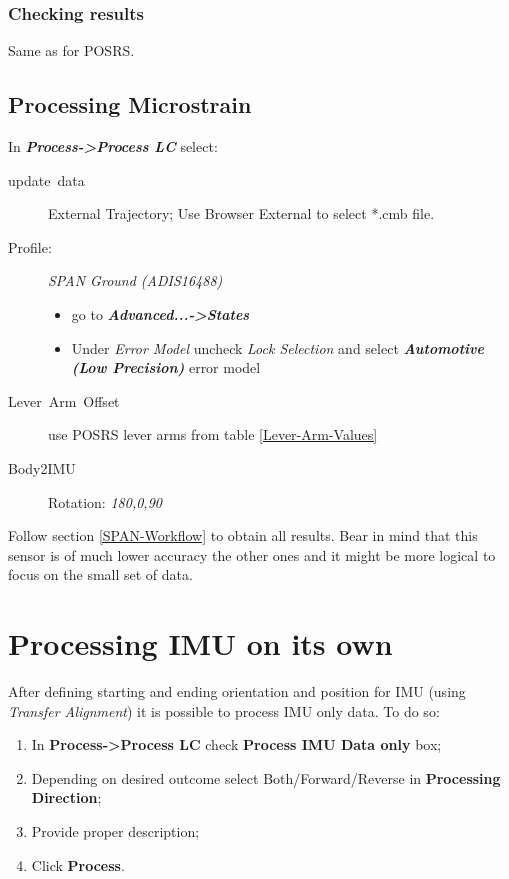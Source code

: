 \documentclass[british]{book}
\begin{document}
\subsubsection{Checking results}

Same as for POSRS.

\subsection{Processing Microstrain}\label{sub:Processing-Microstrain}

In \textbf{\emph{Process->Process LC}} select:
\begin{description}
	\item [{update~data}] External Trajectory; Use Browser External to select {*}.cmb file.
	\item [{Profile:}] \emph{SPAN Ground (ADIS16488) }
		\begin{itemize}
			\item go to \textbf{\emph{Advanced...->States}}
			\item Under \emph{Error Model} uncheck \emph{Lock Selection} and select \textbf{\emph{Automotive (Low Precision)}} error model
		\end{itemize}
	\item [{Lever~Arm~Offset}] use POSRS lever arms from table \ref{Lever-Arm-Values}
	\item [{Body2IMU}] Rotation: \emph{180,0,90 }
\end{description}

Follow section \ref{SPAN-Workflow} to obtain all results. Bear in mind that this sensor is of much lower accuracy the other ones and it might be more logical to focus on the small set of data.

\section{Processing IMU on its own}\label{Processing-IMU-on-its-own}
After defining starting and ending orientation and position for IMU (using \emph{Transfer Alignment}) it is possible to process IMU only data. To do so:
\begin{enumerate}
	\item In \textbf{Process->Process LC} check \textbf{Process IMU Data only }box;
	\item Depending on desired outcome select Both/Forward/Reverse in \textbf{Processing Direction};
	\item Provide proper description;
	\item Click \textbf{Process}.
\end{enumerate}
\end{document}
